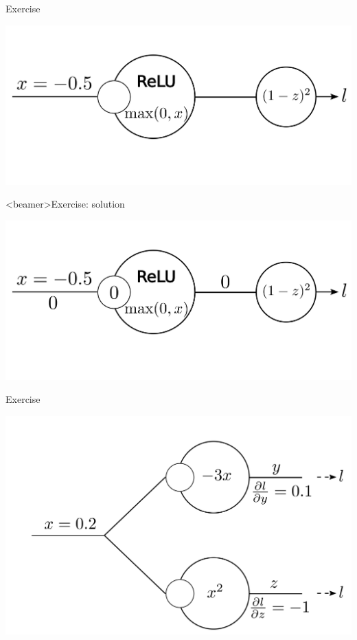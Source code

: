 \documentclass[xcolor=pdftex,dvipsnames,table,mathserif]{beamer}
\begin{document}
\begin{frame}{Exercise}

  \includegraphics[width=\textwidth]{bp_relu_exo2.png}

\end{frame}

\begin{frame}<beamer>{Exercise: solution}

  \includegraphics[width=\textwidth]{bp_relu_exo2_sol.png}

\end{frame}


\begin{frame}{Exercise}

  \includegraphics[width=\textwidth]{bp_split.png}

\end{frame}
\end{document}

